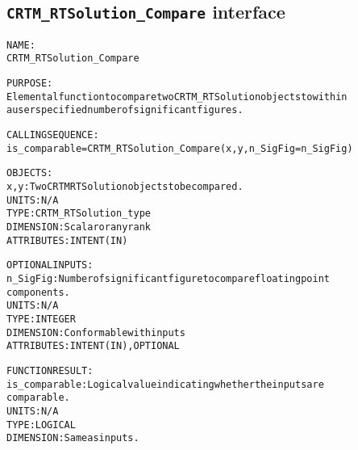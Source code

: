 \subsection{\texttt{CRTM\_RTSolution\_Compare} interface}
  \label{sec:CRTM_RTSolution_Compare_interface}
  \begin{alltt}
  NAME:
        CRTM_RTSolution_Compare
 
  PURPOSE:
        Elemental function to compare two CRTM_RTSolution objects to within
        a user specified number of significant figures.
 
  CALLING SEQUENCE:
        is_comparable = CRTM_RTSolution_Compare( x, y, n_SigFig=n_SigFig )
 
  OBJECTS:
        x, y:          Two CRTM RTSolution objects to be compared.
                       UNITS:      N/A
                       TYPE:       CRTM_RTSolution_type
                       DIMENSION:  Scalar or any rank
                       ATTRIBUTES: INTENT(IN)
 
  OPTIONAL INPUTS:
        n_SigFig:      Number of significant figure to compare floating point
                       components.
                       UNITS:      N/A
                       TYPE:       INTEGER
                       DIMENSION:  Conformable with inputs
                       ATTRIBUTES: INTENT(IN), OPTIONAL
 
  FUNCTION RESULT:
        is_comparable: Logical value indicating whether the inputs are
                       comparable.
                       UNITS:      N/A
                       TYPE:       LOGICAL
                       DIMENSION:  Same as inputs.
  \end{alltt}
